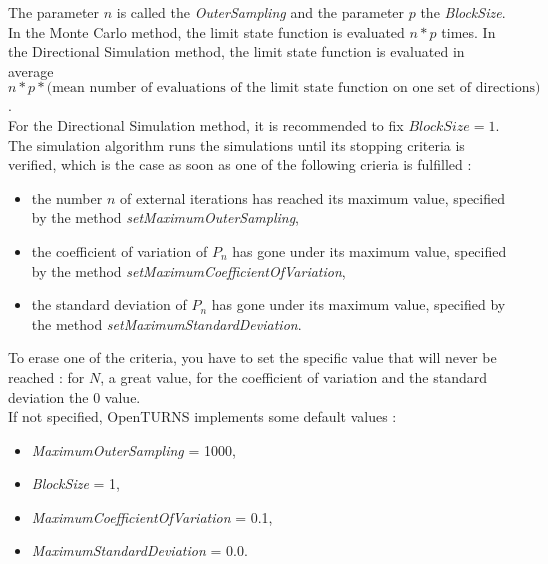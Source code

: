 The parameter $n$ is called the {\itshape OuterSampling} and the parameter $p$ the {\itshape BlockSize}.\\

In the Monte Carlo method, the limit state function is evaluated $n*p$ times. In the Directional Simulation method, the limit state function is evaluated in average $n*p* \mbox{(mean number of evaluations of the limit state function on one set of directions)}$.\\

For the Directional Simulation method, it is recommended to fix $BlockSize = 1$.\\

The simulation algorithm runs the simulations until its stopping criteria is verified, which is the case as soon as one of the following crieria is fulfilled :
\begin{itemize}
\item the number $n$ of external iterations has reached its maximum value, specified by the method {\em setMaximumOuterSampling},
\item the coefficient of variation of $P_n$ has gone under its maximum value, specified by the method {\em setMaximumCoefficientOfVariation},
\item the standard deviation of  $P_n$ has gone under its maximum value, specified by the method {\em setMaximumStandardDeviation}.
\end{itemize}

To erase one of the criteria, you have to set the specific value that will never be reached : for $N$, a great value, for the  coefficient of variation  and the standard deviation the $0$ value.\\

If not specified, OpenTURNS implements some default values :
\begin{itemize}
\item \textit{MaximumOuterSampling} = 1000,
\item \textit{BlockSize} = 1,
\item \textit{MaximumCoefficientOfVariation} = 0.1,
\item \textit{MaximumStandardDeviation} = 0.0.
\end{itemize}





